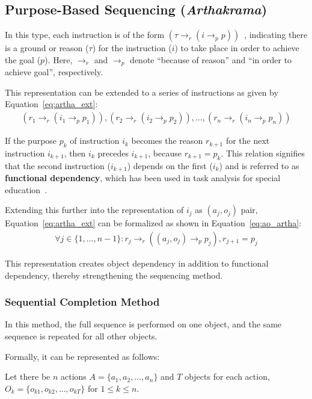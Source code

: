 \documentclass[a4paper,11pt]{lmcs}
\begin{document}
\subsection{Purpose-Based Sequencing (\textit{Arthakrama})}
\label{sec:artha}
In this type, each instruction is of the form \((\tau \rightarrow_r (i \rightarrow_p p))\)~\cite{llm_mira}, indicating there is a ground or reason (\(\tau\)) for the instruction (\(i\)) to take place in order to achieve the goal (\(p\)). Here, \(\rightarrow_r\) and \(\rightarrow_p\) denote ``because of reason'' and ``in order to achieve goal'', respectively.

This representation can be extended to a series of instructions as given by Equation~\ref{eq:artha_ext}:
\begin{eqnarray}
\label{eq:artha_ext}
(r_1 \rightarrow_r (i_1 \rightarrow_p p_1)), (r_2 \rightarrow_r (i_2 \rightarrow_p p_2)), \ldots, (r_n \rightarrow_r (i_n \rightarrow_p p_n))
\end{eqnarray}

If the purpose \(p_k\) of instruction \(i_k\) becomes the reason \(r_{k+1}\) for the next instruction \(i_{k+1}\), then \(i_k\) precedes \(i_{k+1}\), because \(r_{k+1} = p_k\). This relation signifies that the second instruction (\(i_{k+1}\)) depends on the first (\(i_k\)) and is referred to as \textbf{functional dependency}, which has been used in task analysis for special education~\cite{ta}.

Extending this further into the representation of \(i_j\) as \((a_j, o_j)\) pair, Equation~\ref{eq:artha_ext} can be formalized as shown in Equation~\ref{eq:ao_artha}:
\begin{eqnarray}
\label{eq:ao_artha}
\forall j \in \{1, \ldots, n-1\}: r_j \rightarrow_r ((a_j, o_j) \rightarrow_p p_j), r_{j+1} = p_j
\end{eqnarray}

This representation creates object dependency in addition to functional dependency, thereby strengthening the sequencing method.

\subsubsection{Sequential Completion Method}
In this method, the full sequence is performed on one object, and the same sequence is repeated for all other objects.

Formally, it can be represented as follows:

Let there be \(n\) actions \(A = \{a_1, a_2, \ldots, a_n\}\) and \(T\) objects for each action, \(O_k = \{o_{k1}, o_{k2}, \ldots, o_{kT}\}\) for \(1 \leq k \leq n\).
\end{document}
